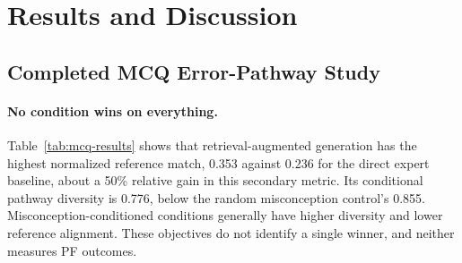 \section{Results and Discussion}

\subsection{Completed MCQ Error-Pathway Study}

\paragraph{No condition wins on everything.} Table~\ref{tab:mcq-results} shows that retrieval-augmented generation has the highest normalized reference match, 0.353 against 0.236 for the direct expert baseline, about a 50\% relative gain in this secondary metric. Its conditional pathway diversity is 0.776, below the random misconception control's 0.855. Misconception-conditioned conditions generally have higher diversity and lower reference alignment. These objectives do not identify a single winner, and neither measures PF outcomes.

